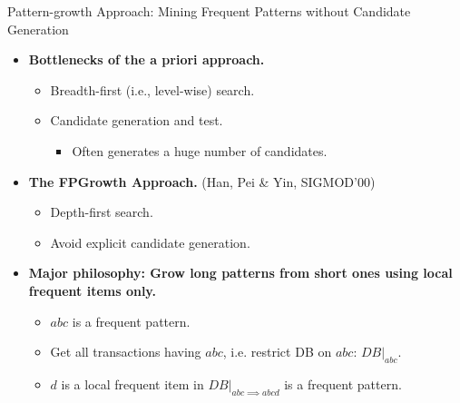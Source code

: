 \begin{frame}{Pattern-growth Approach: Mining Frequent Patterns without
		Candidate Generation}
	\begin{itemize}
		\item \textbf{Bottlenecks of the a priori approach.}
		      \begin{itemize}
			      \item Breadth-first (i.e., level-wise) search.
			      \item Candidate generation and test.
			            \begin{itemize}
				            \item Often generates a huge number of candidates.
			            \end{itemize}
		      \end{itemize}
		\item \textbf{The FPGrowth Approach.} (Han, Pei \& Yin, SIGMOD'00)
		      \begin{itemize}
			      \item Depth-first search.
			      \item Avoid explicit candidate generation.
		      \end{itemize}
		\item \textbf{Major philosophy: Grow long patterns from short ones
			      using local frequent items only.}
		      \begin{itemize}
			      \item $abc$ is a frequent pattern.
			      \item Get all transactions having $abc$, i.e. restrict DB on $abc$:
			            $DB|_{abc}$.
			      \item $d$ is a local frequent item in $DB|_{abc \implies abcd}$ is
			            a frequent pattern.
		      \end{itemize}
	\end{itemize}
\end{frame}

